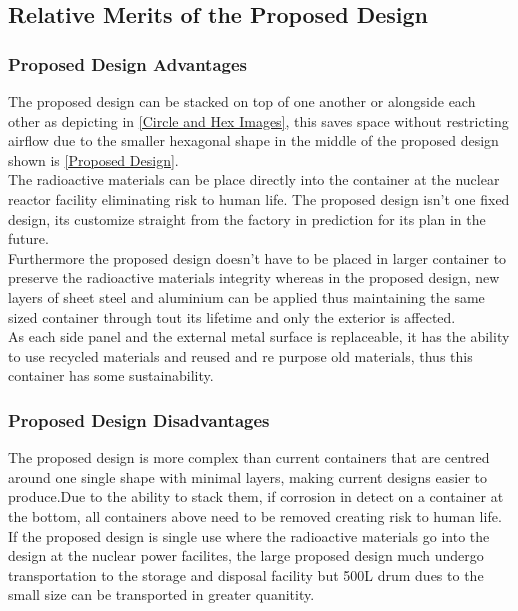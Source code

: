 \subsection{Relative Merits of the Proposed Design}
\label{Relative Merits of the Proposed Design SubSection}

\subsubsection*{Proposed Design Advantages}
\label{Proposed Design Advantages SubSubSection}

The proposed design can be stacked on top of one another or alongside each other as depicting in \cref{Circle and Hex Images}, this saves space without restricting airflow due to the smaller hexagonal shape in the middle of the proposed design shown is \cref{Proposed Design}.\\

The radioactive materials can be place directly into the container at the nuclear reactor facility eliminating risk to human life. The proposed design isn't one fixed design, its customize straight from the factory in prediction for its plan in the future. \\

Furthermore the proposed design doesn't have to be placed in larger container to preserve the radioactive materials integrity whereas in the proposed design, new layers of sheet steel and aluminium can be applied thus maintaining the same sized container through tout its lifetime and only the exterior is affected. \\

As each side panel and the external metal surface is replaceable, it has the ability to use recycled materials and reused and re purpose old materials, thus this container has some sustainability.

\subsubsection*{Proposed Design Disadvantages}
\label{Proposed Design Disadvantages SubSubSection}

The proposed design is more complex than current containers that are centred around one single shape with minimal layers, making current designs easier to produce.Due to the ability to stack them, if corrosion in detect on a container at the bottom, all containers above need to be removed creating risk to human life. \\

If the proposed design is single use where the radioactive materials go into the design at the nuclear power facilites, the large proposed design much undergo transportation to the storage and disposal facility but 500L drum dues to the small size can be transported in greater quanitity.